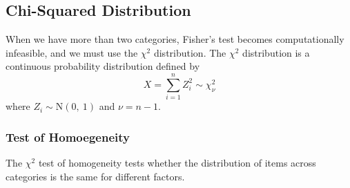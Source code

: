 \documentclass{article}
\begin{document}
\subsection{Chi-Squared Distribution}
When we have more than two categories, Fisher's test becomes computationally infeasible, and we must use
the \(\chi^2\) distribution. The \(\chi^2\) distribution is a continuous probability distribution defined by
\begin{equation*}
    X = \sum_{i = 1}^n Z_i^2 \sim \chi_\nu^2
\end{equation*}
where \(Z_i \sim \mathrm{N}\left( 0,\: 1 \right)\) and \(\nu = n - 1\).
\subsubsection{Test of Homoegeneity}
The \(\chi^2\) test of homogeneity tests whether the distribution
of items across categories is the same for different factors.
\end{document}
